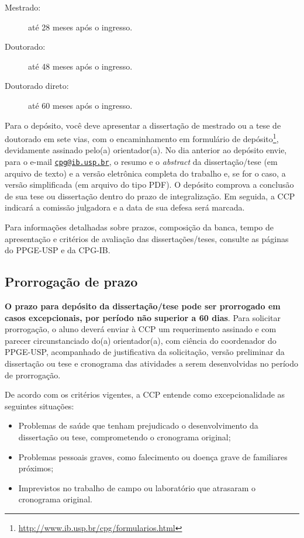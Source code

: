 \documentclass[twoside a4paper 12pt]{report}
\begin{document}
\begin{description}
\item[Mestrado:] até 28 meses após o ingresso.
\item[Doutorado:] até 48 meses após o ingresso.
\item[Doutorado direto:] até 60 meses após o ingresso.
\end{description}

Para o depósito, você deve apresentar a dissertação de mestrado ou a tese de doutorado em sete vias, com o encaminhamento em formulário de depósito\footnote{\url{http://www.ib.usp.br/cpg/formularios.html}}, devidamente assinado pelo(a) orientador(a). No dia anterior ao depósito envie, para o e-mail \href{mailto:cpg@ib.usp.br}{\nolinkurl{cpg@ib.usp.br}}, o resumo e o \emph{abstract} da dissertação/tese (em arquivo de texto) e a versão eletrônica completa do trabalho e, se for o caso, a versão simplificada (em arquivo do tipo PDF). O depósito comprova a conclusão de sua tese ou dissertação dentro do prazo de integralização. Em seguida, a CCP indicará a comissão julgadora e a data de sua defesa será marcada.

Para informações detalhadas sobre prazos, composição da banca, tempo de apresentação e critérios de avaliação das dissertações/teses, consulte as páginas do PPGE-USP e da CPG-IB.

\subsection{Prorrogação de prazo}

\textbf{O prazo para depósito da dissertação/tese pode ser prorrogado em casos excepcionais, por período não superior a 60 dias}. Para solicitar prorrogação, o aluno deverá enviar à CCP um requerimento assinado e com parecer circunstanciado do(a) orientador(a), com ciência do coordenador do PPGE-USP, acompanhado de justificativa da solicitação, versão preliminar da dissertação ou tese e cronograma das atividades a serem desenvolvidas no período de prorrogação.

De acordo com os critérios vigentes, a CCP entende como excepcionalidade as seguintes situações:

\begin{itemize}
\item Problemas de saúde que tenham prejudicado o desenvolvimento da dissertação ou tese, comprometendo o cronograma original;
\item Problemas pessoais graves, como falecimento ou doença grave de familiares próximos;
\item Imprevistos no trabalho de campo ou laboratório que atrasaram o cronograma original.
\end{itemize}
\end{document}
